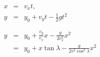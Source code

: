 \documentclass[a4paper,10pt]{letter}
\begin{document}
\begin{eqnarray*}
 x & = & v_x t, \\
 y & = & y_0 + v_y t - \frac{1}{2} g t^2 \\
 \\
 \\
 y & = & y_0 + \frac{v_y}{v_x} x - \frac{g}{2 v_x^2} x^2 \\
  & = & y_0 + x \tan \lambda - \frac{g}{2 v^2 \cos^2 \lambda} x^2 
\end{eqnarray*}
\end{document}
